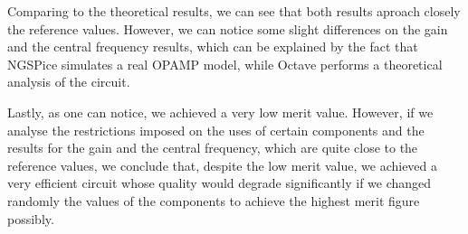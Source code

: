 Comparing to the theoretical results, we can see that both results aproach closely the reference values. However, we can notice some slight differences on the gain and the central frequency results, which can be explained by the fact that NGSPice simulates a real OPAMP model, while Octave performs a theoretical analysis of the circuit.

Lastly, as one can notice, we achieved a very low merit value. However, if we analyse the restrictions imposed on the uses of certain components and the results for the gain and the central frequency, which are quite close to the reference values, we conclude that, despite the low merit value, we achieved a very efficient circuit whose quality would degrade significantly if we changed randomly the values of the components to achieve the highest merit figure possibly. 
